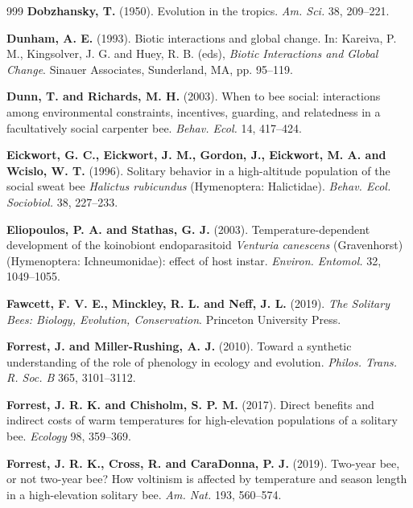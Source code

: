 \documentclass[11pt,a4paper]{article}
\begin{document}
\begin{thebibliography}{999}
\textbf{Dobzhansky, T.} (1950).
Evolution in the tropics.
\textit{Am. Sci.} 38, 209--221.

\textbf{Dunham, A. E.} (1993).
Biotic interactions and global change.
In: Kareiva, P. M., Kingsolver, J. G. and Huey, R. B. (eds), \textit{Biotic Interactions and Global Change}.
Sinauer Associates, Sunderland, MA, pp. 95--119.

\textbf{Dunn, T. and Richards, M. H.} (2003). When to bee social: interactions among environmental constraints, incentives, guarding, and relatedness in a facultatively social carpenter bee. \textit{Behav. Ecol.} 14, 417--424.

\textbf{Eickwort, G. C., Eickwort, J. M., Gordon, J., Eickwort, M. A. and Wcislo, W. T.} (1996). Solitary behavior in a high-altitude population of the social sweat bee \textit{Halictus rubicundus} (Hymenoptera: Halictidae). \textit{Behav. Ecol. Sociobiol.} 38, 227--233.

\textbf{Eliopoulos, P. A. and Stathas, G. J.} (2003). Temperature-dependent development of the koinobiont endoparasitoid \textit{Venturia canescens} (Gravenhorst) (Hymenoptera: Ichneumonidae): effect of host instar. \textit{Environ. Entomol.} 32, 1049--1055.

\textbf{Fawcett, F. V. E., Minckley, R. L. and Neff, J. L.} (2019).
\textit{The Solitary Bees: Biology, Evolution, Conservation}.
Princeton University Press.

\textbf{Forrest, J. and Miller-Rushing, A. J.} (2010).
Toward a synthetic understanding of the role of phenology in ecology and evolution.
\textit{Philos. Trans. R. Soc. B} 365, 3101--3112.

\textbf{Forrest, J. R. K. and Chisholm, S. P. M.} (2017).
Direct benefits and indirect costs of warm temperatures for high-elevation populations of a solitary bee.
\textit{Ecology} 98, 359--369.

\textbf{Forrest, J. R. K., Cross, R. and CaraDonna, P. J.} (2019).
Two-year bee, or not two-year bee? How voltinism is affected by temperature and season length in a high-elevation solitary bee.
\textit{Am. Nat.} 193, 560--574.


\end{thebibliography}
\end{document}

